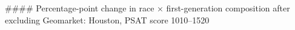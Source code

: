 #### Percentage-point change in race × first-generation composition after excluding Geomarket: Houston, PSAT score 1010–1520
